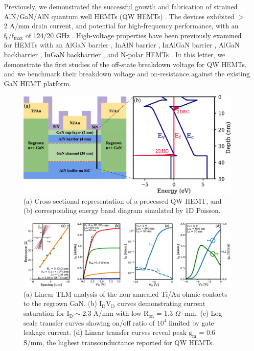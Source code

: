 \documentclass[journal]{IEEEtran}
\begin{document}
Previously, we demonstrated the successful growth and fabrication of strained AlN/GaN/AlN quantum well HEMTs (QW HEMTs) \cite{Wang2012,Islam2016,Song2017}. The devices exhibited $>$ 2 A/mm drain current, and potential for high-frequency performance, with an $\mathrm{f_t}/\mathrm{f_{max}}$ of 124/20 GHz \cite{Song2017}. High-voltage properties have been previously examined for HEMTs with an AlGaN barrier \cite{Palacios2006b, Palacios2006a,Chung2010}, InAlN barrier \cite{Chung2009,Saunier2012,Snider2012,Yue2013}, InAlGaN barrier \cite{Guo2013,Lee2013}, AlGaN backbarrier \cite{Shinohara2010,Shinohara2011,Shinohara2011a,Shinohara2012,Tang2015}, \textcolor{black}{InGaN backbarrier \cite{YugangZhou2005}}, and N-polar HEMTs \cite{Dasgupta2009,Nidhi2012,Denninghoff2012,Denninghoff2012a,Denninghoff2013,Romanczyk2018}. In this letter, we demonstrate the first studies of the off-state breakdown voltage for QW HEMTs, and we benchmark their breakdown voltage and on-resistance against the existing GaN HEMT platform.
\begin{figure}[!b]
\centering
\includegraphics[width=\columnwidth]{Figure1.eps}
\caption{(a) Cross-sectional representation of a processed QW HEMT, and (b) corresponding energy band diagram simulated by 1D Poisson. }
\label{fig:epi}
\end{figure}

\begin{figure}[!t]
\centering
\includegraphics[width=\textwidth]{Figure2.eps}
\caption{(a) Linear TLM analysis of the non-annealed Ti/Au ohmic contacts to the regrown GaN. (b) $\mathrm{I_DV_D}$ curves demonstrating current saturation for $\mathrm{I_D}\sim$2.3 A/mm with low $\mathrm{R_{on}}$ = 1.3 $\Omega\cdot$mm. (c) Log-scale transfer curves showing on/off ratio of $\mathrm{10^4}$ limited by gate leakage current. (d) Linear transfer curves reveal peak $\mathrm{g_m}$ = 0.6 S/mm, the highest transconductance reported for QW HEMTs.}
\label{fig:IdVg}
\end{figure}
\end{document}
